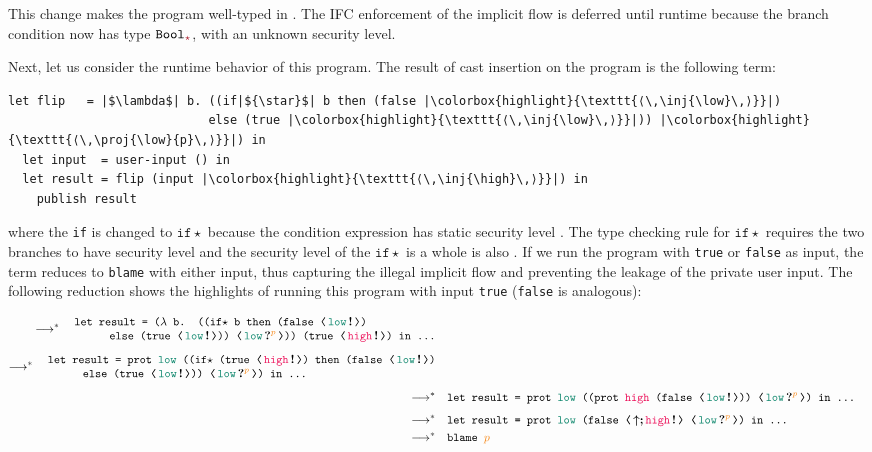 \noindent This change makes the program well-typed in \Surface. The IFC
enforcement of the implicit flow is deferred until runtime because the branch
condition now has type $\Bool_{\unk}$, with an unknown security level.

Next, let us consider the runtime behavior of this program. The result of cast
insertion on the \Surface program is the following \CC term:

\begin{lstlisting}[style=tt]
  let flip   = |$\lambda$| b. ((if|${\star}$| b then (false |\colorbox{highlight}{\texttt{⟨\,\inj{\low}\,⟩}}|)
                            else (true |\colorbox{highlight}{\texttt{⟨\,\inj{\low}\,⟩}}|)) |\colorbox{highlight}{\texttt{⟨\,\proj{\low}{p}\,⟩}}|) in
  let input  = user-input () in
  let result = flip (input |\colorbox{highlight}{\texttt{⟨\,\inj{\high}\,⟩}}|) in
    publish result
\end{lstlisting}

\noindent where the \texttt{if} is changed
to $\mathtt{if}\star$ because the condition expression has static
security level \unk{}.  The type checking rule for $\mathtt{if}\star$
requires the two branches to have security level \unk{} and the
security level of the $\mathtt{if}\star$ is a whole is also \unk{}.
%
If we run the program with \texttt{true} or \texttt{false} as input, the \CC
term reduces to \texttt{blame}  with either input, thus capturing the
illegal implicit flow and preventing the leakage of the private user input. The
following reduction shows the highlights of running this program with input
\texttt{true} (\texttt{false} is analogous):

{\small
  \begin{align*}
    \longrightarrow^{*}
    \begin{split}
      &\quad \texttt{let result = ($\lambda$ b. ((if${\star}$ b then (false ⟨\,\inj{\low}\,⟩)} \\[-3pt]
      &\quad\quad\qquad\texttt{else (true ⟨\,\inj{\low}\,⟩)) ⟨\,\proj{\low}{p}\,⟩)) (true ⟨\,\inj{\high}\,⟩) in ...}
    \end{split} \\[1ex]
    \longrightarrow^{*}
    \begin{split}
      &\quad \texttt{let result = prot \low ((if${\star}$ (true ⟨\,\inj{\high}\,⟩) then (false ⟨\,\inj{\low}\,⟩)} \\[-3pt]
      &\quad\quad\qquad\texttt{else (true ⟨\,\inj{\low}\,⟩)) ⟨\,\proj{\low}{p}\,⟩) in ...}
    \end{split}\\[1ex]
    \longrightarrow^{*} &
    \quad \texttt{let result = prot \low ((prot \high (false ⟨\,\inj{\low}\,⟩)) ⟨\,\proj{\low}{p}\,⟩) in ...} \\[1ex]
    \longrightarrow^{*} &
    \quad\texttt{let result = prot \low (false ⟨\,\up\seq\inj{\high}\,⟩ ⟨\,\proj{\low}{p}\,⟩) in ...} \\
    \longrightarrow^{*} &
    \quad\texttt{blame \bl{p}}
\end{align*}}

